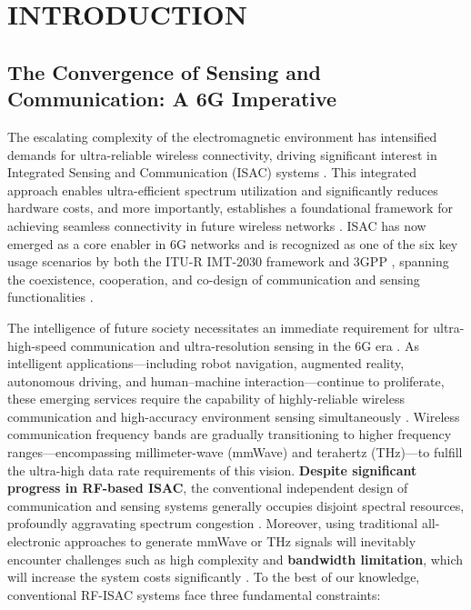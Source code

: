 \section{INTRODUCTION}

\subsection{The Convergence of Sensing and Communication: A 6G Imperative}

The escalating complexity of the electromagnetic environment has intensified demands for ultra-reliable wireless connectivity, driving significant interest in Integrated Sensing and Communication (ISAC) systems \cite{O_ISAC_070}. This integrated approach enables ultra-efficient spectrum utilization and significantly reduces hardware costs, and more importantly, establishes a foundational framework for achieving seamless connectivity in future wireless networks \cite{O_ISAC_070}. ISAC has now emerged as a core enabler in 6G networks and is recognized as one of the six key usage scenarios by both the ITU-R IMT-2030 framework \cite{O_ISAC_162} and 3GPP \cite{O_ISAC_162}, spanning the coexistence, cooperation, and co-design of communication and sensing functionalities \cite{O_ISAC_070}.

The intelligence of future society necessitates an immediate requirement for ultra-high-speed communication and ultra-resolution sensing in the 6G era \cite{O_ISAC_016}. As intelligent applications---including robot navigation, augmented reality, autonomous driving, and human--machine interaction---continue to proliferate, these emerging services require the capability of highly-reliable wireless communication and high-accuracy environment sensing simultaneously \cite{O_ISAC_351}. Wireless communication frequency bands are gradually transitioning to higher frequency ranges---encompassing millimeter-wave (mmWave) and terahertz (THz)---to fulfill the ultra-high data rate requirements of this vision. \textbf{Despite significant progress in RF-based ISAC}, the conventional independent design of communication and sensing systems generally occupies disjoint spectral resources, profoundly aggravating spectrum congestion \cite{O_ISAC_351}. Moreover, using traditional all-electronic approaches to generate mmWave or THz signals will inevitably encounter challenges such as high complexity and \textbf{bandwidth limitation}, which will increase the system costs significantly \cite{O_ISAC_286}. To the best of our knowledge, conventional RF-ISAC systems face three fundamental constraints:

